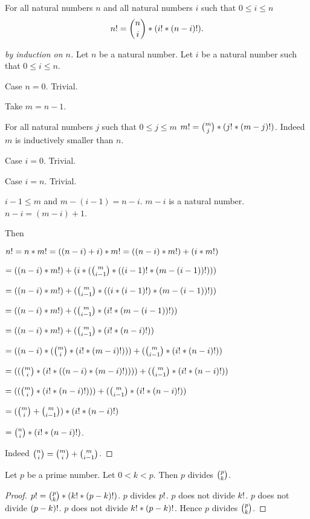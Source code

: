 \documentclass[11pt]{article}
\begin{document}
\begin{forthel}
\begin{lemma} For all natural numbers $n$ and all natural numbers $i$ 
such that  $0 \leq i \leq n$
$$n ! = {n \choose i} * (i ! * (n-i) !).$$
\end{lemma}

\begin{proof}[by induction on $n$]
Let $n$ be a natural number.
Let $i$ be a natural number such that $0 \leq i \leq n$.

Case $n = 0$. Trivial.

Take $m = n - 1$.  

For all natural numbers $j$ such that $0 \leq j \leq m$ $m ! = 
{m \choose j} * (j ! * (m-j) !)$.
Indeed $m$ is inductively smaller than $n$.

Case $i = 0$. Trivial.

Case $i = n$. Trivial.

$i - 1 \leq m$ and $m - (i-1) = n - i$. $m - i$ is a natural number. 
$n - i = (m - i) + 1$.

Then

$n ! = n * m ! = ((n-i) + i) * m ! = ((n-i) * m !) + (i * m !)$

$= ((n-i) * m !) + (i * ({m \choose i-1} * ((i-1) ! * (m - (i-1)) !)))$

$= ((n-i) * m !) + ({m \choose i-1} * ((i * (i-1) !) * (m - (i-1)) !))$

$=  ((n-i) * m !) + ({m \choose i-1} * (i ! * (m - (i-1)) !))$

$=  ((n-i) * m !) + ({m \choose i-1} * (i ! * (n-i) !))$

$= ((n-i) * ({m \choose i} * (i ! * (m-i) !))) + ({m \choose i-1} * (i ! * (n-i) !))$

$= (({m \choose i} * (i ! * ((n-i) * (m-i) !)))) + ({m \choose i-1} * (i ! * (n-i) !))$

$= (({m \choose i} * (i ! * (n-i) !))) + ({m \choose i-1} * (i ! * (n-i) !))$

$= ({m \choose i} + {m \choose i-1}) * (i ! * (n-i) !) $

$=  {n \choose i} * (i ! * (n-i) !)$.

Indeed ${n \choose i} = {m \choose i} + {m \choose i-1}$.

\end{proof}


\begin{lemma}
Let $p$ be a prime number.
Let $0 < k < p$. Then
$p$ divides ${p \choose k}$.
\end{lemma}
\begin{proof}
$p ! = {p \choose k} * (k ! * (p-k) !)$.
$p$ divides $p !$.
$p$ does not divide $k !$.
$p$ does not divide $(p-k) !$.
$p$ does not divide $k ! * (p-k) !$.
Hence 
$p$ divides ${p \choose k}$.
\end{proof}

\end{forthel}
\end{document}

